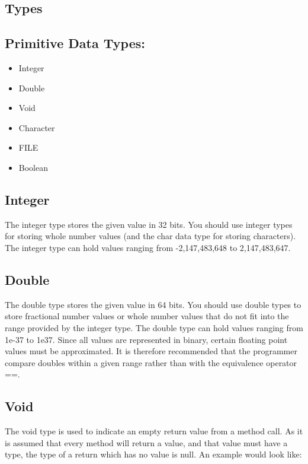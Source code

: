 \begin{homeworkProblem}
	\chapter{Types}
	\section{Primitive Data Types:}
	\begin{itemize}
		\item Integer
		\item Double
		\item Void
		\item Character
		\item FILE
		\item Boolean
	\end{itemize}
	
	\section{Integer}
	The integer type stores the given value in 32 bits. You should use integer types for storing whole number values (and the char data type for storing characters). The integer type can hold values ranging from -2,147,483,648 to 2,147,483,647.
	
	\section{Double}
	
	The double type stores the given value in 64 bits. You should use double types to store fractional number values or whole number values that do not fit into the range provided by the integer type. The double type can hold values ranging from 1e-37 to 1e37. Since all values are represented in binary, certain floating point values must be approximated. It is therefore recommended that the programmer compare doubles within a given range rather than with the equivalence operator ==.
	
	\section{Void}
	
	The void type is used to indicate an empty return value from a method call. As it is assumed that every method will return a value, and that value must have a type, the type of a return which has no value is null. An example would look like:
	

\end{homeworkProblem}
